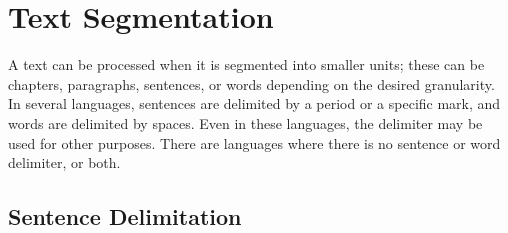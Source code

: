 \documentclass{KBook}
\begin{document}

\section{Text Segmentation}

A text can be processed when it is segmented into smaller units; these can be chapters, paragraphs, sentences, or words depending on the desired granularity. 
In several languages, sentences are delimited by a period or a specific mark, and words are delimited by spaces. 
Even in these languages, the delimiter may be used for other purposes. 
There are languages where there is no sentence or word delimiter, or both.

\subsection{Sentence Delimitation}
\end{document}
